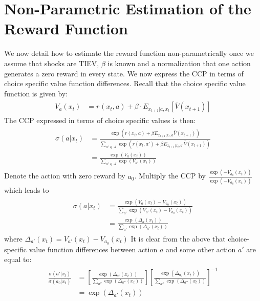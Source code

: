 \documentclass{article}
\begin{document}
\section{Non-Parametric Estimation of the Reward Function}
We now detail how to estimate the reward function non-parametrically once we assume that shocks are TIEV, $\beta$ is known and a normalization that one action generates a zero reward in every state. 
We now express the CCP in terms of choice specific value function differences. Recall that the choice specific value function is given by:
\begin{align}
\begin{split}
V_a(x_t) &= r_{}(x_t,a)+\beta  \cdot E_{x_{t+1}|a,x_t} \left[ \overline{V}(x_{t+1}) \right] 
\end{split}
\end{align}
The CCP expressed in terms of choice specific values is then:
\begin{align} 
\begin{split}
\sigma(a|x_t)&=\frac{\exp\left(r(x_t,a)+\beta E_{x_{t+1}|x_t,a} \overline{V}(x_{t+1})\right)}{\sum_{a'\in\mathcal{A}} \exp\left(r(x_t,a')+\beta E_{x_{t+1}|x_t,a'} \overline{V}(x_{t+1})\right)}\\
&=\frac{\exp(V_a(x_t))}{\sum_{a'\in\mathcal{A}} \exp(V_{a'}(x_t))}
\end{split}
\end{align}
Denote the action with zero reward by $a_0$. Multiply the CCP by $\frac{\exp(-V_{a_0}(x_t))}{\exp(-V_{a_0}(x_t))}$ which leads to  
\begin{align}
\begin{split}
\sigma(a|x_t)&=\frac{\exp(V_a(x_t)-V_{a_0}(x_t))}{\sum_{a'} \exp(V_{a'}(x_t)-V_{a_0}(x_t))}\\
&=\frac{\exp(\Delta_a(x_t))}{\sum_{a'} \exp(\Delta_{a'}(x_t))}
\end{split}
\end{align}
where $\Delta_{a'}(x_t)=V_{a'}(x_t)-V_{a_0}(x_t)$
It is clear from the above that choice-specific value function differences between action $a$ and some other action $a'$ are equal to:
\begin{align}\label{eq:ccp_ratio}
\begin{split}
\frac{\sigma(a'|x_t)}{\sigma(a_0|x_t)}&=
\left[
\frac
  {\exp(\Delta_{a'}(x_t))}
  {\sum_{a''} \exp(\Delta_{a''}(x_t))}
\right]
\left[\frac{\exp(\Delta_{a_0}(x_t))}{\sum_{a''} \exp(\Delta_{a''}(x_t))}\right]^{-1}\\
&=\exp(\Delta_{a'}(x_t))
\end{split}
\end{align}
\end{document}

